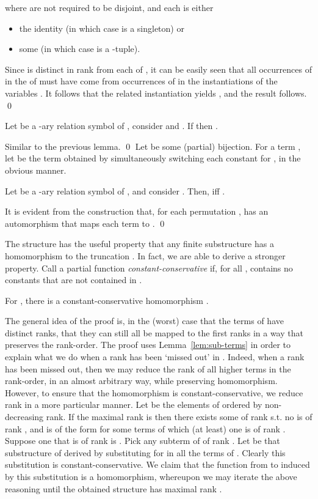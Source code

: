 \documentclass{LMCS}
\begin{document}
where  are not required to be disjoint, and each  is either
\begin{itemize}
\item the identity  (in which case  is a singleton) or 
\item some  (in which case  is a -tuple).
\end{itemize}
Since  is distinct in rank from each of , it can be easily seen that all occurrences of  in the  of   must have come from occurrences of  in the instantiations of the variables . It follows that the related instantiation  yields , and the result follows.
\qed

\begin{lem}
\label{lem:sub-consts}
Let  be a -ary relation symbol of , consider  and . If  then .
\end{lem}
\proof
Similar to the previous lemma.
\qed
Let  be some (partial) bijection. For a term , let  be the term obtained by simultaneously switching each constant  for , in the obvious manner.
\begin{lem}
\label{lem:aut}
Let  be a -ary relation symbol of , and consider .
Then,  iff   .
\end{lem}
\proof
It is evident from the construction that, for each permutation ,  has an automorphism that maps each term  to .
\qed

The structure  has the useful property that any finite substructure  has a homomorphism to the truncation . In fact, we are able to derive a stronger property. Call a partial function  \emph{constant-conservative} if, for all ,  contains no constants that are not contained in .
\begin{lem}
\label{lem:AhomT}
For , there is a constant-conservative homomorphism .
\end{lem}
\noindent The general idea of the proof is, in the (worst) case that the terms of  have distinct ranks, that they can still all be mapped to the first  ranks in a way that preserves the rank-order. The proof uses Lemma~\ref{lem:sub-terms} in order to explain what we do when a rank has been `missed out' in . Indeed, when a rank has been missed out, then we may reduce the rank of all higher terms in the rank-order, in an almost arbitrary way, while preserving homomorphism. However, to ensure that the homomorphism is constant-conservative, we reduce rank in a more particular manner. 
\proof
Let  be the elements of  ordered by non-decreasing rank. If the maximal rank is  then there exists some  of rank  s.t. no  is of rank , and  is of the form  for some terms  of which (at least) one is of rank . Suppose one that is of rank  is . Pick any subterm  of  of rank . Let  be that substructure of  derived by substituting  for  in all the terms of . Clearly this substitution is constant-conservative. We claim that the function from  to  induced by this substitution is a homomorphism, whereupon we may iterate the above reasoning until the obtained structure has maximal rank .
\end{document}
